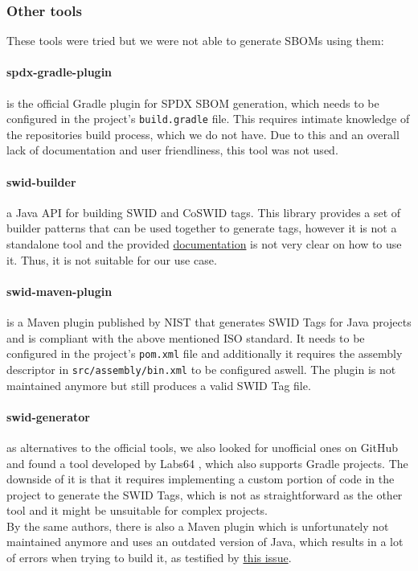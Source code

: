 \subsubsection{Other tools}

These tools were tried but we were not able to generate SBOMs using them:

\paragraph{spdx-gradle-plugin} is the official Gradle plugin for SPDX SBOM generation, which needs to be configured in the project's \verb|build.gradle| file. This requires intimate knowledge of the repositories build process, which we do not have. Due to this and an overall lack of documentation and user friendliness, this tool was not used.

\paragraph{swid-builder} a Java API for building SWID and CoSWID tags. This library provides a set of builder patterns that can be used together to generate tags, however it is not a standalone tool and the provided \href{https://pages.nist.gov/swid-tools/swid-builder/apidocs/index.html}{documentation} is not very clear on how to use it. Thus, it is not suitable for our use case.

\paragraph{swid-maven-plugin} is a Maven plugin published by NIST \cite{repository:swid-maven-plugin} that generates SWID Tags for Java projects and is compliant with the above mentioned ISO standard. It needs to be configured in the project's \verb|pom.xml| file and additionally it requires the assembly descriptor in \verb|src/assembly/bin.xml| to be configured aswell. The plugin is not maintained anymore but still produces a valid SWID Tag file.

\paragraph{swid-generator} as alternatives to the official tools, we also looked for unofficial ones on GitHub and found a tool developed by Labs64 \cite{repo:swid-generator}, which also supports Gradle projects. The downside of it is that it requires implementing a custom portion of code in the project to generate the SWID Tags, which is not as straightforward as the other tool and it might be unsuitable for complex projects. 
\\ By the same authors, there is also a Maven plugin which is unfortunately not maintained anymore and uses an outdated version of Java, which results in a lot of errors when trying to build it, as testified by \href{https://github.com/Labs64/swid-maven-plugin/issues/5}{this issue}.


